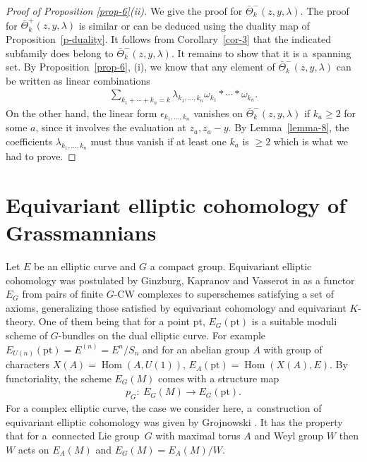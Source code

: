 \documentclass[pdftex]{sigma}
\numberwithin{equation}{section}
\begin{document}
\begin{proof}[Proof of Proposition \ref{prop-6}(ii)] We give the proof for $\bar\Theta^-_k(z,y,\lambda)$. The proof for $\bar\Theta^+_k(z,y,\lambda)$ is similar or can be deduced using the duality map of Proposition~\ref{p-duality}. It follows from Corollary~\ref{cor-3} that the indicated subfamily does belong to $\bar\Theta^-_k(z,y,\lambda)$. It remains to show that it is a~spanning set. By Proposition~\ref{prop-6}, (i), we know that any element of $\bar\Theta^-_k(z,y,\lambda)$ can be written as linear combinations
\begin{gather*}
 \sum_{k_1+\cdots+k_n=k}\lambda_{k_1,\dots,k_n} \omega_{k_1}*\cdots*\omega_{k_n}.
\end{gather*}
On the other hand, the linear form $\epsilon_{k_1,\dots,k_n}$ vanishes on $\bar \Theta^-_k(z,y,\lambda)$ if $k_a\geq2$ for some $a$, since it involves the evaluation at $z_a,z_a-y$. By Lemma~\ref{lemma-8}, the coefficients $\lambda_{k_1,\dots,k_n}$ must thus vanish if at least one $k_a$ is $\geq2$ which is what we had to prove.
\end{proof}

\section{Equivariant elliptic cohomology of Grassmannians}\label{s-4}

Let $E$ be an elliptic curve and $G$ a compact group. Equivariant elliptic cohomology was postulated by Ginzburg, Kapranov and Vasserot in \cite{GKV} as a functor $E_G$ from pairs of finite $G$-CW complexes to superschemes satisfying a set of axioms, generalizing those satisfied by equivariant cohomology and equivariant $K$-theory. One of them being that for a point pt, $E_G(\mathrm{pt})$ is a suitable moduli scheme of $G$-bundles on the dual elliptic curve. For example $E_{U(n)}(\mathrm{pt})=E^{(n)}=E^n/S_n$ and for an abelian group $A$ with group of characters $X(A)=\operatorname{Hom}(A,U(1))$, $E_A(\mathrm{pt})=\operatorname{Hom}(X(A),E)$. By functoriality, the scheme $E_G(M)$ comes with a structure map
\begin{gather*}
 p_G\colon \ E_G(M)\to E_G(\mathrm{pt}).
\end{gather*}
For a complex elliptic curve, the case we consider here, a~construction of equivariant elliptic cohomology was given by Grojnowski \cite{GKV,Grojnowski}. It has the property that for a~connected Lie group~$G$ with maximal torus $A$ and Weyl group $W$ then $W$ acts on $E_A(M)$ and $E_G(M)=E_A(M)/W$.
\end{document}

